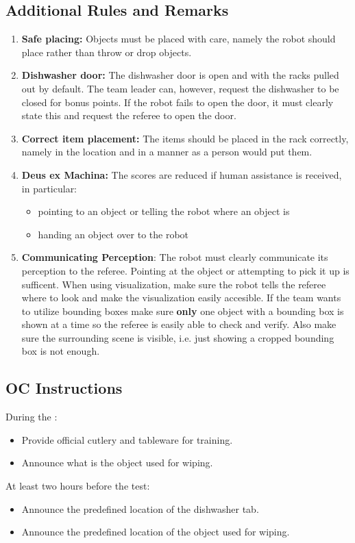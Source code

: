 \subsection*{Additional Rules and Remarks}
\begin{enumerate}[nosep]
	\item \textbf{Safe placing:} Objects must be placed with care, namely the robot should place rather than throw or drop objects.
	\item \textbf{Dishwasher door:} The dishwasher door is open and with the racks pulled out by default.
	The team leader can, however, request the dishwasher to be closed for bonus points. If the robot fails to open the door, it must clearly state this and request the referee to open the door.
	\item \textbf{Correct item placement:} The items should be placed in the rack correctly, namely in the location and in a manner as a person would put them.
	\item \textbf{Deus ex Machina:} The scores are reduced if human assistance is received, in particular:
	\begin{itemize}[nosep]
		\item pointing to an object or telling the robot where an object is
		\item handing an object over to the robot
	\end{itemize}
	\item \textbf{Communicating Perception}: The robot must clearly communicate its perception to the referee.
	Pointing at the object or attempting to pick it up is sufficent. When using visualization, make sure the robot 
	tells the referee where to look and make the visualization easily accesible. 
	If the team wants to utilize bounding boxes make sure \textbf{only} one object with a bounding box is shown 
	at a time so the referee is easily able to check and verify. Also make sure the surrounding scene is visible, i.e.
	just showing a cropped bounding box is not enough.
\end{enumerate}

\subsection*{OC Instructions}

During the \SetupDays:
\begin{itemize}
	\item Provide official cutlery and tableware for training.
	\item Announce what is the object used for wiping.
\end{itemize}
At least two hours before the test:
\begin{itemize}
	\item Announce the predefined location of the dishwasher tab.
	\item Announce the predefined location of the object used for wiping.
\end{itemize}


